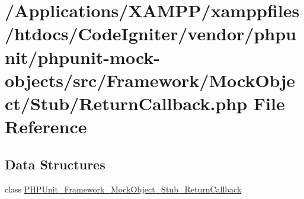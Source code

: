 \hypertarget{_return_callback_8php}{}\section{/\+Applications/\+X\+A\+M\+P\+P/xamppfiles/htdocs/\+Code\+Igniter/vendor/phpunit/phpunit-\/mock-\/objects/src/\+Framework/\+Mock\+Object/\+Stub/\+Return\+Callback.php File Reference}
\label{_return_callback_8php}
\subsection*{Data Structures}
\begin{DoxyCompactItemize}
\item 
class \mbox{\hyperlink{class_p_h_p_unit___framework___mock_object___stub___return_callback}{P\+H\+P\+Unit\+\_\+\+Framework\+\_\+\+Mock\+Object\+\_\+\+Stub\+\_\+\+Return\+Callback}}
\end{DoxyCompactItemize}
